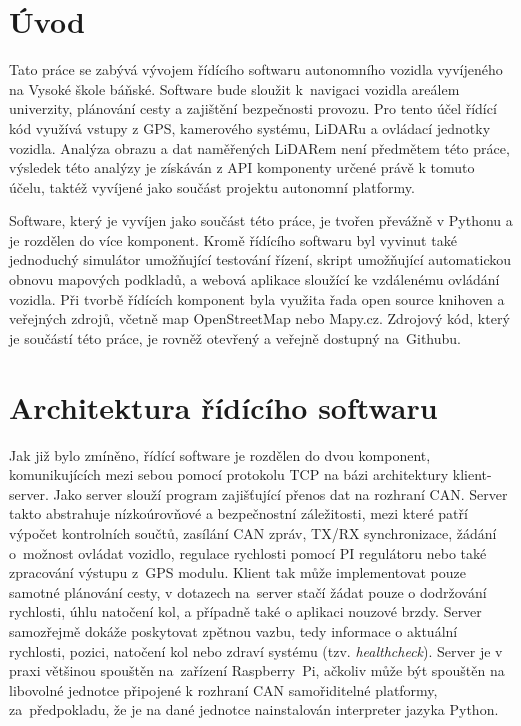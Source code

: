 \documentclass[czech, bachelor]{diploma}
\begin{document}
\MakeTitlePages

\chapter{Úvod} \label{sec:Introduction}
Tato práce se zabývá vývojem řídícího softwaru autonomního vozidla vyvíjeného na Vysoké škole báňské. Software bude sloužit
k~navigaci vozidla areálem univerzity, plánování cesty a zajištění bezpečnosti provozu. Pro tento účel řídící kód využívá vstupy
z GPS, kamerového systému, LiDARu a ovládací jednotky vozidla. Analýza obrazu a dat naměřených LiDARem není předmětem této práce,
výsledek této analýzy je získáván z API komponenty určené právě k tomuto účelu, taktéž vyvíjené jako součást projektu autonomní
platformy.

Software, který je vyvíjen jako součást této práce, je tvořen převážně v Pythonu a je rozdělen do více komponent. Kromě řídícího
softwaru byl vyvinut také jednoduchý simulátor umožňující testování řízení, skript umožňující automatickou obnovu mapových
podkladů, a webová aplikace sloužící ke vzdálenému ovládání vozidla. Při tvorbě řídících komponent byla využita řada open source
knihoven a veřejných zdrojů, včetně map OpenStreetMap\cite{openstreetmap-source} nebo Mapy.cz\cite{mapycz-source}. Zdrojový kód,
který je součástí této práce, je rovněž otevřený a veřejně dostupný na~Githubu\cite{car-client-source, car-webapp-source,
car-map-downloader-source, car-can-source, car-simulator-source, geologger-source}.

\chapter{Architektura řídícího softwaru} \label{software-architecture}
Jak již bylo zmíněno, řídící software je rozdělen do dvou komponent, komunikujících mezi sebou pomocí protokolu TCP na bázi
architektury klient-server. Jako server slouží program zajišťující přenos dat na rozhraní CAN. Server takto abstrahuje
nízkoúrovňové a bezpečnostní záležitosti, mezi které patří výpočet kontrolních součtů, zasílání CAN zpráv, TX/RX synchronizace,
žádání o~možnost ovládat vozidlo, regulace rychlosti pomocí PI regulátoru nebo také zpracování výstupu z~GPS modulu. Klient tak
může implementovat pouze samotné plánování cesty, v dotazech na~server stačí žádat pouze o dodržování rychlosti, úhlu natočení
kol, a případně také o aplikaci nouzové brzdy. Server samozřejmě dokáže poskytovat zpětnou vazbu, tedy informace o aktuální
rychlosti, pozici, natočení kol nebo zdraví systému (tzv. \emph{healthcheck}). Server je v praxi většinou spouštěn na~zařízení
Raspberry~Pi, ačkoliv může být spouštěn na libovolné jednotce připojené k rozhraní CAN samořiditelné platformy, za~předpokladu,
že je na dané jednotce nainstalován interpreter jazyka Python.
\end{document}
